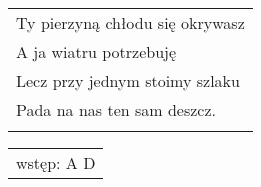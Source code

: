 \documentclass[a5paper]{article}
\begin{document}
\noindent
\begin{tabular}{@{}p{6.50cm}@{}}
Ty pierzyną chłodu się okrywasz \\
A ja wiatru potrzebuję \\
Lecz przy jednym stoimy szlaku \\
Pada na nas ten sam deszcz. \\ \\
\end{tabular}

\fontsize{8pt}{10pt}\selectfont
{}
\noindent
\begin{tabular}{@{}p{6.50cm}@{}}
wstęp: A D
\end{tabular}
\end{document}
